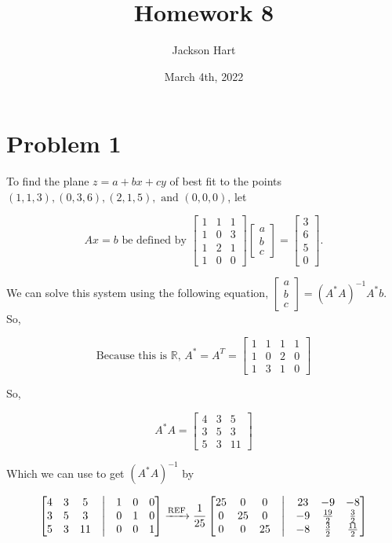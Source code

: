 \documentclass[12pt, letterpaper]{article}
\title{Homework 8}
\author{Jackson Hart}
\date{March 4th, 2022}
\begin{document}
\maketitle
\section*{Problem 1}
To find the plane $z = a + bx + cy$ of best fit to the points $(1, 1, 3), (0, 3, 6), (2, 1, 5), \text{ and } (0, 0, 0)$, let

\[ Ax = b \text{ be defined by } \begin{bmatrix} 1 & 1 & 1 \\ 1 & 0 & 3 \\ 1 & 2 & 1 \\ 1 & 0 & 0 \end{bmatrix} \begin{bmatrix} a \\ b \\ c \end{bmatrix} = \begin{bmatrix} 3 \\ 6 \\ 5 \\ 0 \end{bmatrix}. \]

We can solve this system using the following equation, $\begin{bmatrix} a \\ b \\ c \end{bmatrix} = (A^*A)^{-1}A^*b$. So, 

\[ \text{Because this is $\mathbb{R}$, } A^* = A^T = \begin{bmatrix} 1 & 1 & 1 & 1 \\ 1 & 0 & 2 & 0 \\ 1 & 3 & 1 & 0 \end{bmatrix} \]

So,

\[ A^*A = \begin{bmatrix} 4 & 3 & 5 \\ 3 & 5 & 3 \\ 5 & 3 & 11 \end{bmatrix} \]

Which we can use to get $(A^*A)^{-1}$ by

\[ \begin{bmatrix} 4 & 3 & 5 &\bigm| & 1 & 0 & 0 \\ 3 & 5 & 3 &\bigm| & 0 & 1 & 0 \\ 5 & 3 & 11 &\bigm| & 0 & 0 & 1 \end{bmatrix} \xrightarrow[]{\text{REF}} \frac{1}{25} \begin{bmatrix} 25 & 0 & 0 &\bigm| & 23 & -9 & -8 \\ 0 & 25 & 0 &\bigm| & -9 & \frac{19}{2} & \frac{3}{2} \\ 0 & 0 & 25 &\bigm| & -8 & \frac{3}{2} & \frac{11}{2} \end{bmatrix} \]
\end{document}
